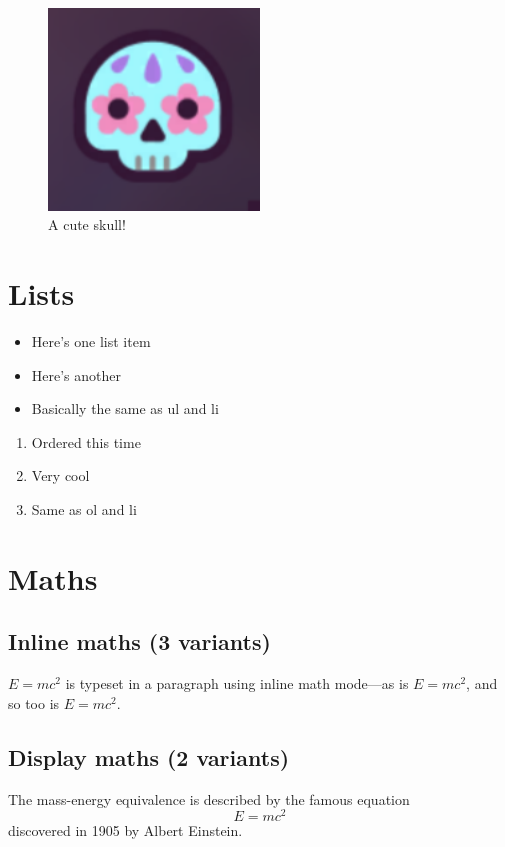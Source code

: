 \documentclass[12pt]{book}
\begin{document}
\begin{figure}
    \centering
    \includegraphics[width=0.5\textwidth]{skull}
    \caption{A cute skull!}
    \label{fig:skull2}
\end{figure}

\section{Lists}

\begin{itemize}
    \item Here's one list item 
    \item Here's another
    \item Basically the same as ul and li
\end{itemize}

\begin{enumerate}
    \item Ordered this time 
    \item Very cool
    \item Same as ol and li
\end{enumerate}

\section{Maths} 
\subsection{Inline maths (3 variants)}
\begin{math}E=mc^2\end{math} is typeset in a paragraph using inline math mode---as is $E=mc^2$, and so too is \(E=mc^2\).

\subsection{Display maths (2 variants)}
The mass-energy equivalence is described by the famous equation \[ E=mc^2 \] discovered in 1905 by Albert Einstein. 
\end{document}
